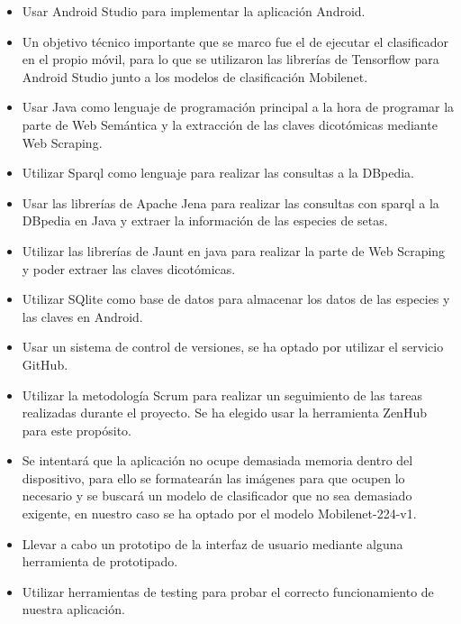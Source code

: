 \begin{itemize}
	\item Usar Android Studio para implementar la aplicación Android.
	\item Un objetivo técnico importante que se marco fue el de ejecutar el clasificador en el propio móvil, para lo que se utilizaron las librerías de Tensorflow para Android Studio junto a los modelos de clasificación Mobilenet.
	\item Usar Java como lenguaje de programación principal a la hora de programar la parte de Web Semántica y la extracción de las claves dicotómicas mediante Web Scraping.
	\item Utilizar Sparql como lenguaje para realizar las consultas a la DBpedia.
	\item Usar las librerías de Apache Jena para realizar las consultas con sparql a la DBpedia en Java y extraer la información de las especies de setas.
	\item Utilizar las librerías de Jaunt en java para realizar la parte de Web Scraping y poder extraer las claves dicotómicas.
	\item Utilizar SQlite como base de datos para almacenar los datos de las especies y las claves en Android.
	\item Usar un sistema de control de versiones, se ha optado por utilizar el servicio GitHub.
	\item Utilizar la metodología Scrum para realizar un seguimiento de las tareas realizadas durante el proyecto. Se ha elegido usar la herramienta ZenHub para este propósito.
	\item Se intentará que la aplicación no ocupe demasiada memoria dentro del dispositivo, para ello se formatearán las imágenes para que ocupen lo necesario y se buscará un modelo de clasificador que no sea demasiado exigente, en nuestro caso se ha optado por el modelo Mobilenet-224-v1.
	\item Llevar a cabo un prototipo de la interfaz de usuario mediante alguna herramienta de prototipado.
	\item Utilizar herramientas de testing para probar el correcto funcionamiento de nuestra aplicación.
\end{itemize}
